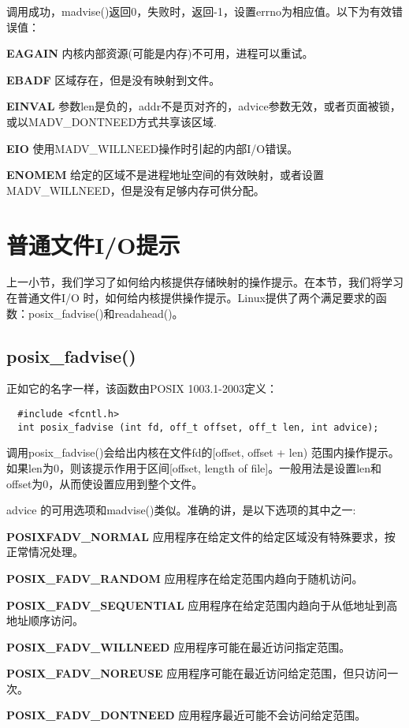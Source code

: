 调用成功，madvise()返回0，失败时，返回-1，设置errno为相应值。以下为有效错误值：

\begin{eqlist*}
\item[\textbf{EAGAIN}] 内核内部资源(可能是内存)不可用，进程可以重试。
\item[\textbf{EBADF}] 区域存在，但是没有映射到文件。
\item[\textbf{EINVAL}] 参数len是负的，addr不是页对齐的，advice参数无效，或者页面被锁，或以MADV\_DONTNEED方式共享该区域.
\item[\textbf{EIO}] 使用MADV\_WILLNEED操作时引起的内部I/O错误。
\item[\textbf{ENOMEM}] 给定的区域不是进程地址空间的有效映射，或者设置MADV\_WILLNEED，但是没有足够内存可供分配。
\end{eqlist*}

\section{普通文件I/O提示}

上一小节，我们学习了如何给内核提供存储映射的操作提示。在本节，我们将学习在普通文件I/O 时，如何给内核提供操作提示。Linux提供了两个满足要求的函数：posix\_fadvise()和readahead()。

\subsection{posix\_fadvise()}

正如它的名字一样，该函数由POSIX 1003.1-2003定义：

\begin{lstlisting}
  #include <fcntl.h>
  int posix_fadvise (int fd, off_t offset, off_t len, int advice);
\end{lstlisting}

调用posix\_fadvise()会给出内核在文件fd的[offset, offset + len) 范围内操作提示。如果len为0，则该提示作用于区间[offset, length of file]。一般用法是设置len和offset为0，从而使设置应用到整个文件。

advice 的可用选项和madvise()类似。准确的讲，是以下选项的其中之一:

\begin{eqlist*}
\item[\textbf{POSIXFADV\_NORMAL}] 应用程序在给定文件的给定区域没有特殊要求，按正常情况处理。
\item[\textbf{POSIX\_FADV\_RANDOM}] 应用程序在给定范围内趋向于随机访问。
\item[\textbf{POSIX\_FADV\_SEQUENTIAL}] 应用程序在给定范围内趋向于从低地址到高地址顺序访问。
\item[\textbf{POSIX\_FADV\_WILLNEED}] 应用程序可能在最近访问指定范围。
\item[\textbf{POSIX\_FADV\_NOREUSE}] 应用程序可能在最近访问给定范围，但只访问一次。
\item[\textbf{POSIX\_FADV\_DONTNEED}] 应用程序最近可能不会访问给定范围。
\end{eqlist*}

